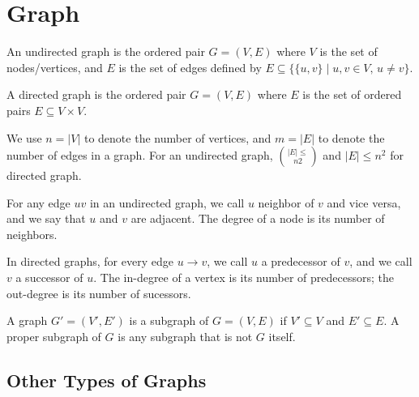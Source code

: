 \section{Graph}

\vspace{\parskip}

\begin{definition} 
    An undirected graph is the ordered pair $G=(V,E)$ where $V$ is the set of nodes/vertices, and $E$ is the set of edges defined by $E \subseteq \{ \{u,v\} \mid u,v \in V,\, u \neq v \}$.
\end{definition}

\begin{definition} 
    A directed graph is the ordered pair $G=(V,E)$ where $E$ is the set of ordered pairs $E \subseteq V \times V$.
\end{definition}

We use $n = |V|$ to denote the number of vertices, and $m = |E|$ to denote the number of edges in a graph. For an undirected graph, $|E| \leq \choose{n 2}$ and $|E| \leq n^2$ for directed graph. 

\begin{definition}      
    For any edge $uv$ in an undirected graph, we call $u$ neighbor of $v$ and vice versa, and we say that $u$ and $v$ are adjacent. The degree of a node is its number of neighbors.

    In directed graphs, for every edge $u \to v$, we call $u$ a predecessor of $v$, and we call $v$ a successor of $u$. The in-degree of a vertex is its number of predecessors; the out-degree is its number of sucessors.
\end{definition}

\begin{definition}[Subgraphs] 
    A graph $G' = (V',E')$ is a subgraph of $G=(V,E)$ if $V' \subseteq V$ and $E' \subseteq E$. A proper subgraph of $G$ is any subgraph that is not $G$ itself.
\end{definition}


\subsection{Other Types of Graphs}   

